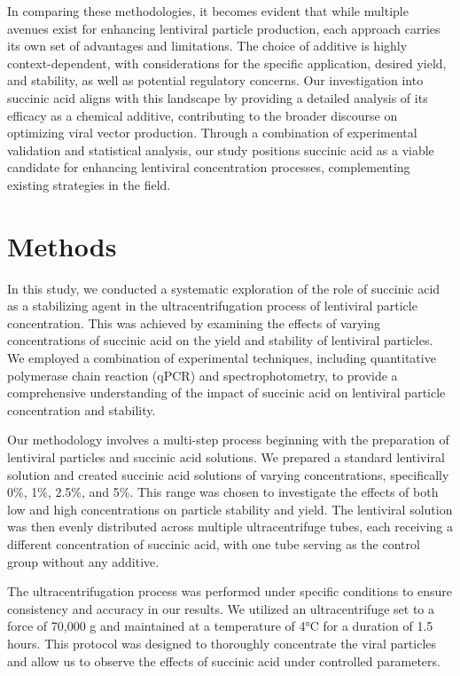 \documentclass{article}
\begin{document}
In comparing these methodologies, it becomes evident that while multiple avenues exist for enhancing lentiviral particle production, each approach carries its own set of advantages and limitations. The choice of additive is highly context-dependent, with considerations for the specific application, desired yield, and stability, as well as potential regulatory concerns. Our investigation into succinic acid aligns with this landscape by providing a detailed analysis of its efficacy as a chemical additive, contributing to the broader discourse on optimizing viral vector production. Through a combination of experimental validation and statistical analysis, our study positions succinic acid as a viable candidate for enhancing lentiviral concentration processes, complementing existing strategies in the field.

\section{Methods}
In this study, we conducted a systematic exploration of the role of succinic acid as a stabilizing agent in the ultracentrifugation process of lentiviral particle concentration. This was achieved by examining the effects of varying concentrations of succinic acid on the yield and stability of lentiviral particles. We employed a combination of experimental techniques, including quantitative polymerase chain reaction (qPCR) and spectrophotometry, to provide a comprehensive understanding of the impact of succinic acid on lentiviral particle concentration and stability.

Our methodology involves a multi-step process beginning with the preparation of lentiviral particles and succinic acid solutions. We prepared a standard lentiviral solution and created succinic acid solutions of varying concentrations, specifically 0\%, 1\%, 2.5\%, and 5\%. This range was chosen to investigate the effects of both low and high concentrations on particle stability and yield. The lentiviral solution was then evenly distributed across multiple ultracentrifuge tubes, each receiving a different concentration of succinic acid, with one tube serving as the control group without any additive.

The ultracentrifugation process was performed under specific conditions to ensure consistency and accuracy in our results. We utilized an ultracentrifuge set to a force of 70,000 g and maintained at a temperature of 4°C for a duration of 1.5 hours. This protocol was designed to thoroughly concentrate the viral particles and allow us to observe the effects of succinic acid under controlled parameters.
\end{document}

